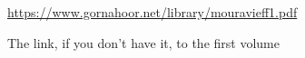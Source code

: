 \begin{footnotesize}
\begin{sffamily}
\url{https://www.gornahoor.net/library/mouravieff1.pdf}

The link, if you don't have it, to the first volume


\hfill

\end{sffamily}
\end{footnotesize}

